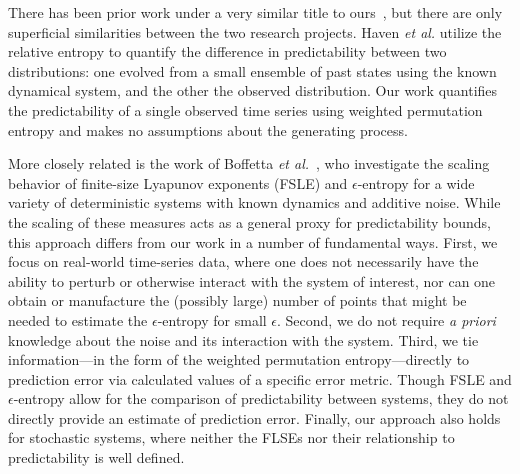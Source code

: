 There has been prior work under a very similar title to
ours~\cite{haven2005}, but there are only superficial similarities
between the two research projects. Haven \emph{et al.} utilize the
relative entropy to quantify the difference in predictability between
two distributions: one evolved from a small ensemble of past states
using the known dynamical system, and the other the observed
distribution. Our work quantifies the predictability of a single
observed time series using weighted permutation entropy and makes no
assumptions about the generating process.

More closely related is the work of Boffetta \emph{et
  al.}~\cite{boffetta02}, who investigate the scaling behavior of
finite-size Lyapunov exponents (FSLE) and $\epsilon$-entropy for a
wide variety of deterministic systems with known dynamics and additive
noise.  While the scaling of these measures acts as a general proxy
for predictability bounds, this approach differs from our work in a
number of fundamental ways.  First, we focus on real-world time-series
data, where one does not necessarily have the ability to perturb or
otherwise interact with the system of interest, nor can one obtain or
manufacture the (possibly large) number of points that might be needed
to estimate the $\epsilon$-entropy for small $\epsilon$.  Second, we
do not require \emph{a priori} knowledge about the noise and its
interaction with the system.  Third, we tie information---in the form
of the weighted permutation entropy---directly to prediction error via
calculated values of a specific error metric.  Though FSLE and
$\epsilon$-entropy allow for the comparison of predictability between
systems, they do not directly provide an estimate of prediction error.
Finally, our approach also holds for stochastic systems, where neither
the FLSEs nor their relationship to predictability is well defined.
